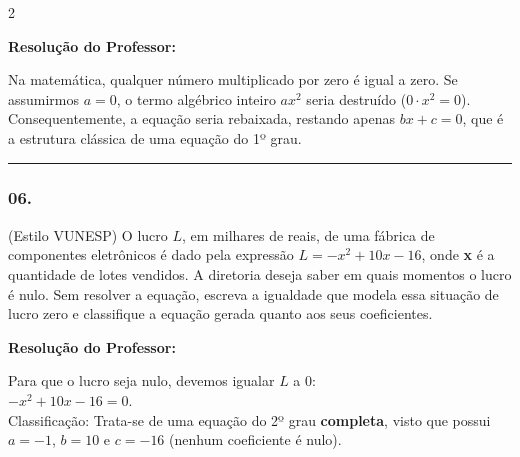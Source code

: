 \begin{multicols*}{2}
\ifgabarito
    \begin{tcolorbox}[colback=CorTitUm!5, colframe=CorTitUm, boxrule=1pt, arc=4pt, left=6pt, right=6pt, top=6pt, bottom=6pt]
    \small\textbf{\textcolor{CorTitUm}{Resolução do Professor:}}\par\vspace{0.1cm}
    \color{CinzaEscuro}
    Na matemática, qualquer número multiplicado por zero é igual a zero. Se assumirmos $a = 0$, o termo algébrico inteiro $ax^2$ seria destruído ($0 \cdot x^2 = 0$). Consequentemente, a equação seria rebaixada, restando apenas $bx + c = 0$, que é a estrutura clássica de uma equação do 1º grau.
    \end{tcolorbox}
\fi

\par\vspace{\espacoQuestao}

\noindent\textcolor{CorLinha}{\rule{\linewidth}{0.5pt}} 
\par\vspace{\espacoPreQuestao}
\subsubsection*{06.} (Estilo VUNESP) O lucro $ L $, em milhares de reais, de uma fábrica de componentes eletrônicos é dado pela expressão $ L = -x^2 + 10x - 16 $, onde \textbf{x} é a quantidade de lotes vendidos. A diretoria deseja saber em quais momentos o lucro é nulo. Sem resolver a equação, escreva a igualdade que modela essa situação de lucro zero e classifique a equação gerada quanto aos seus coeficientes.

\ifgabarito
    \begin{tcolorbox}[colback=CorTitUm!5, colframe=CorTitUm, boxrule=1pt, arc=4pt, left=6pt, right=6pt, top=6pt, bottom=6pt]
    \small\textbf{\textcolor{CorTitUm}{Resolução do Professor:}}\par\vspace{0.1cm}
    \color{CinzaEscuro}
    Para que o lucro seja nulo, devemos igualar $L$ a $0$:\\
    $-x^2 + 10x - 16 = 0$.\\
    Classificação: Trata-se de uma equação do 2º grau \textbf{completa}, visto que possui $a = -1$, $b = 10$ e $c = -16$ (nenhum coeficiente é nulo).
    \end{tcolorbox}
\fi

\par\vspace{\espacoQuestao}


\end{multicols*}
